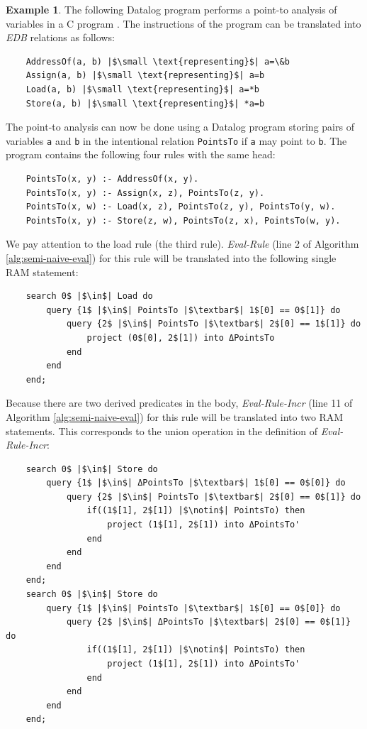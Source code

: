 \documentclass[twoside,11pt]{report}
\theoremstyle{definition}
\newtheorem{exmp}{Example}[chapter]
\begin{document}
\begin{exmp}
  The following Datalog program performs a point-to analysis of variables in a C program \cite{PGL-014}. The instructions of the program can be translated into \textit{EDB} relations as follows:
  \begin{verbatim}
    AddressOf(a, b) |$\small \text{representing}$| a=\&b
    Assign(a, b) |$\small \text{representing}$| a=b
    Load(a, b) |$\small \text{representing}$| a=*b
    Store(a, b) |$\small \text{representing}$| *a=b
  \end{verbatim}
  The point-to analysis can now be done using a Datalog program storing pairs of variables \texttt{a} and \texttt{b} in the intentional relation \texttt{PointsTo} if \texttt{a} may point to \texttt{b}. The program contains the following four rules with the same head:
  \begin{verbatim}
    PointsTo(x, y) :- AddressOf(x, y).
    PointsTo(x, y) :- Assign(x, z), PointsTo(z, y).
    PointsTo(x, w) :- Load(x, z), PointsTo(z, y), PointsTo(y, w).
    PointsTo(x, y) :- Store(z, w), PointsTo(z, x), PointsTo(w, y).
  \end{verbatim}
  We pay attention to the load rule (the third rule). \textit{Eval-Rule} (line 2 of Algorithm \ref{alg:semi-naive-eval}) for this rule will be translated into the following single RAM statement:
  \begin{verbatim}
    search 0$ |$\in$| Load do
        query {1$ |$\in$| PointsTo |$\textbar$| 1$[0] == 0$[1]} do
            query {2$ |$\in$| PointsTo |$\textbar$| 2$[0] == 1$[1]} do
                project (0$[0], 2$[1]) into ΔPointsTo
            end
        end
    end;
  \end{verbatim}
  Because there are two derived predicates in the body, \textit{Eval-Rule-Incr} (line 11 of Algorithm \ref{alg:semi-naive-eval}) for this rule will be translated into two RAM statements. This corresponds to the union operation in the definition of \textit{Eval-Rule-Incr}:
  \begin{verbatim}
    search 0$ |$\in$| Store do
        query {1$ |$\in$| ΔPointsTo |$\textbar$| 1$[0] == 0$[0]} do
            query {2$ |$\in$| PointsTo |$\textbar$| 2$[0] == 0$[1]} do
                if((1$[1], 2$[1]) |$\notin$| PointsTo) then
                    project (1$[1], 2$[1]) into ΔPointsTo'
                end
            end
        end
    end;
    search 0$ |$\in$| Store do
        query {1$ |$\in$| PointsTo |$\textbar$| 1$[0] == 0$[0]} do
            query {2$ |$\in$| ΔPointsTo |$\textbar$| 2$[0] == 0$[1]} do
                if((1$[1], 2$[1]) |$\notin$| PointsTo) then
                    project (1$[1], 2$[1]) into ΔPointsTo'
                end
            end
        end
    end;
  \end{verbatim}
\end{exmp}
\label{exmp:point-to}
\end{document}
